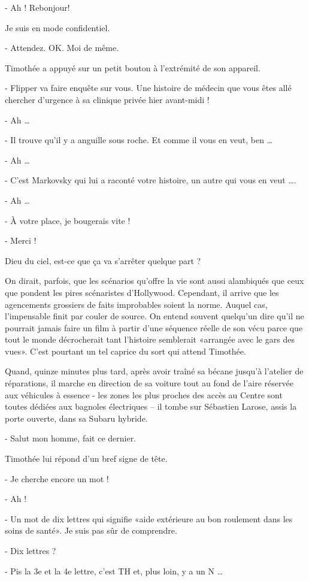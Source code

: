- Ah ! Rebonjour!

Je suis en mode confidentiel.

- Attendez. OK. Moi de même.

Timothée a appuyé sur un petit bouton à l’extrémité de son appareil.

- Flipper va faire enquête sur vous. Une histoire de médecin que vous êtes allé chercher d’urgence à sa clinique privée hier avant-midi !

- Ah …

- Il trouve qu’il y a anguille sous roche. Et comme il vous en veut, ben …

- Ah …

- C’est Markovsky qui lui a raconté votre histoire, un autre qui vous en veut ….

- Ah …

- À votre place, je bougerais vite !

- Merci !

Dieu du ciel, est-ce que ça va s’arrêter quelque part ?

On dirait, parfois, que les scénarios qu’offre la vie sont aussi alambiqués que ceux que pondent les pires scénaristes d’Hollywood. Cependant, il arrive que les agencements grossiers de faits improbables soient la norme. Auquel cas, l’impensable finit par couler de source. On entend souvent quelqu’un dire qu’il ne pourrait jamais faire un film à partir d’une séquence réelle de son vécu parce que tout le monde décrocherait tant l’histoire semblerait «arrangée avec le gars des vues». C’est pourtant un tel caprice du sort qui attend Timothée.

Quand, quinze minutes plus tard, après avoir traîné sa bécane jusqu’à l’atelier de réparations, il marche en direction de sa voiture tout au fond de l’aire réservée aux véhicules à essence - les zones les plus proches des accès au Centre sont toutes dédiées aux bagnoles électriques – il tombe sur Sébastien Larose, assis la porte ouverte, dans sa Subaru hybride.

- Salut mon homme, fait ce dernier.

Timothée lui répond d’un bref signe de tête.

- Je cherche encore un mot !

- Ah !

- Un mot de dix lettres qui signifie «aide extérieure au bon roulement dans les soins de santé». Je suis pas sûr de comprendre.

- Dix lettres ?

- Pis la 3e et la 4e lettre, c’est TH et, plus loin, y a un N …

